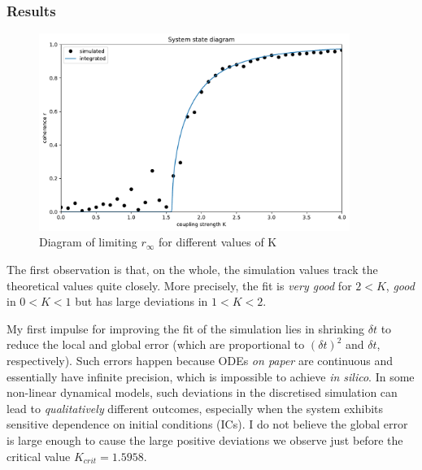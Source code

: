 \documentclass[11pt,a4paper]{article}
\begin{document}
\subsubsection{Results}\label{1results}

\begin{figure}[H]
	\centering
	\includegraphics[width=0.9\textwidth]{graphics/1_K-vs-r_omegaDistr=normal_N=1000_1611577031.pdf}
	\caption{Diagram of limiting $r_\infty$ for different values of K}
	\label{1}
\end{figure}


The first observation is that, on the whole, the simulation values track the theoretical values quite closely. 
More precisely, the fit is \textit{very good} for $2<K$, \textit{good} in $0<K<1$ but has large deviations in $1<K<2$. 

My first impulse for improving the fit of the simulation lies in shrinking $\delta t$ to reduce the local and global error (which are proportional to $(\delta t)^2$ and $\delta t$, respectively).
Such errors happen because ODEs \textit{on paper} are continuous and essentially have infinite precision, which is impossible to achieve \textit{in silico}. 
In some non-linear dynamical models, such deviations in the discretised simulation can lead to \textit{qualitatively} different outcomes, especially when the system exhibits sensitive dependence on initial conditions (ICs).
I do not believe the global error is large enough to cause the large positive deviations we observe just before the critical value $K_{crit} = 1.5958$. 
\end{document}
